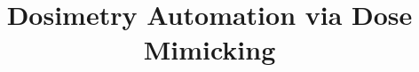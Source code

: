 \documentclass{article}
\title{Dosimetry Automation via Dose Mimicking}
\date{}
\begin{document}
	\maketitle
	\setcounter{tocdepth}{5}
	\tableofcontents
	
	\begin{abstract}
		
	\end{abstract}
	
	
	
	
	
	
\end{document}
